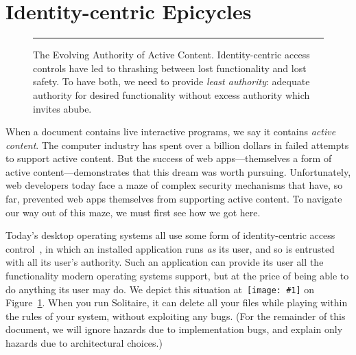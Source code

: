 \documentclass[letterpaper,twocolumn,10pt]{article}
\newcommand{\q}[1]{{\texttt{[image: \#1]}}}
\begin{document}
\section{Identity-centric Epicycles}
\label{sec:epicycles}

\begin{figure}[t!]
  
\caption[The Evolving Authority of Active Content]{The Evolving Authority of 
Active Content. Identity-centric access controls have led to thrashing 
between lost functionality and lost safety. To have both, we need to provide 
\emph{least authority}: adequate authority for desired functionality without 
excess authority which invites abube. \\ } \hrule
  \label{fig:evo-auth}
\end{figure}

When a document contains live interactive programs, we say it contains 
\emph{active content}. The computer industry has spent over a billion dollars 
in failed attempts to support active content. But the success of web 
apps---themselves a form of active content---demonstrates that this dream was 
worth pursuing. Unfortunately, web developers today face a maze of complex 
security mechanisms that have, so far, prevented web apps themselves from 
supporting active content. To navigate our way out of this maze, we must 
first see how we got here.

Today's desktop operating systems all use some form of identity-centric 
access control~\cite{karp:abac-soa}, in which an installed application runs 
\emph{as} its user, and so is entrusted with all its user's authority. Such 
an application can provide its user all the functionality modern operating 
systems support, but at the price of being able to do anything its user may 
do. We depict this situation at~\q{2} on Figure~\ref{fig:evo-auth}. When you 
run Solitaire, it can delete all your files while playing within the rules of 
your system, without exploiting any bugs. (For the remainder of this 
document, we will ignore hazards due to implementation bugs, and explain only 
hazards due to architectural choices.)
\end{document}
